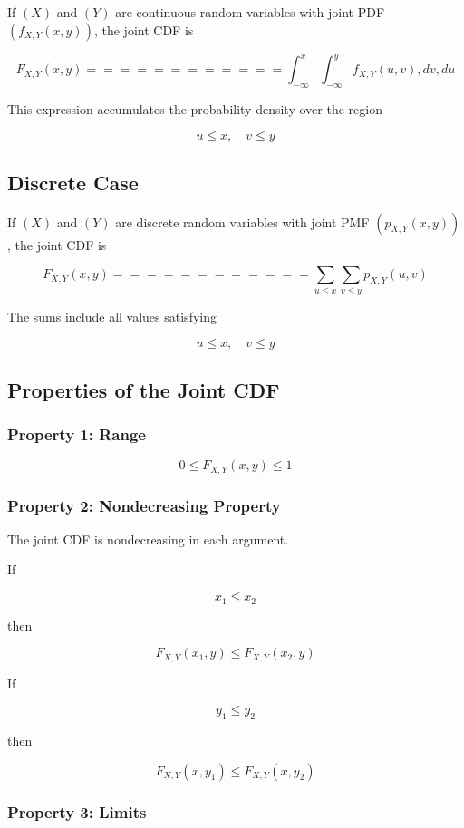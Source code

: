 \documentclass[12pt]{article}
\begin{document}
If $(X)$ and $(Y)$ are continuous random variables with joint PDF $(f_{X,Y}(x,y))$, the joint CDF is

\[
F_{X,Y}(x,y)
============

\int_{-\infty}^{x}
\int_{-\infty}^{y}
f_{X,Y}(u,v),dv,du
\]

This expression accumulates the probability density over the region

\[
u \le x, \quad v \le y
\]

\subsection*{Discrete Case}

If $(X)$ and $(Y)$ are discrete random variables with joint PMF $(p_{X,Y}(x,y))$, the joint CDF is

\[
F_{X,Y}(x,y)
============

\sum_{u \le x}
\sum_{v \le y}
p_{X,Y}(u,v)
\]

The sums include all values satisfying

\[
u \le x,\quad v \le y
\]

\subsection*{Properties of the Joint CDF}

\subsubsection*{Property 1: Range}

\[
0 \le F_{X,Y}(x,y) \le 1
\]

\subsubsection*{Property 2: Nondecreasing Property}

The joint CDF is nondecreasing in each argument.

If

\[
x_1 \le x_2
\]

then

\[
F_{X,Y}(x_1,y) \le F_{X,Y}(x_2,y)
\]

If

\[
y_1 \le y_2
\]

then

\[
F_{X,Y}(x,y_1) \le F_{X,Y}(x,y_2)
\]

\subsubsection*{Property 3: Limits}
\end{document}
